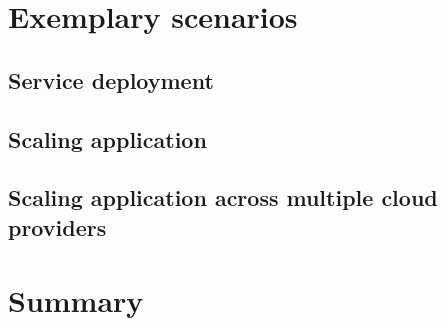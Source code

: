 \section{Exemplary scenarios}

\subsection{Service deployment}

\subsection{Scaling application}

\subsection{Scaling application across multiple cloud providers}

\section{Summary}

